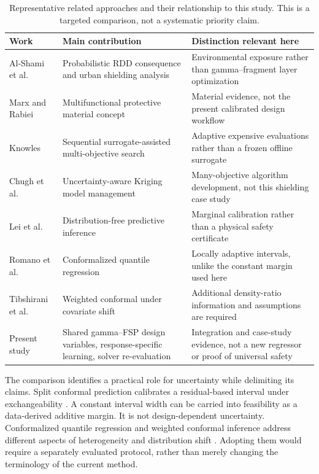 \begin{table}[htbp]
\centering\small
\caption{Representative related approaches and their relationship to this study. This is a targeted comparison, not a systematic priority claim.}\label{tab:related}
\begin{tabular}{@{}p{.25\linewidth}p{.32\linewidth}p{.35\linewidth}@{}}
\toprule Work & Main contribution & Distinction relevant here \\\midrule
Al-Shami et al. \cite{AlShami2026} & Probabilistic RDD consequence and urban shielding analysis & Environmental exposure rather than gamma--fragment layer optimization \\
Marx and Rabiei \cite{MarxRabiei2017CMF} & Multifunctional protective material concept & Material evidence, not the present calibrated design workflow \\
Knowles \cite{Knowles2006ParEGO} & Sequential surrogate-assisted multi-objective search & Adaptive expensive evaluations rather than a frozen offline surrogate \\
Chugh et al. \cite{Chugh2018KRVEA} & Uncertainty-aware Kriging model management & Many-objective algorithm development, not this shielding case study \\
Lei et al. \cite{Lei2018Conformal} & Distribution-free predictive inference & Marginal calibration rather than a physical safety certificate \\
Romano et al. \cite{Romano2019CQR} & Conformalized quantile regression & Locally adaptive intervals, unlike the constant margin used here \\
Tibshirani et al. \cite{Tibshirani2019Shift} & Weighted conformal under covariate shift & Additional density-ratio information and assumptions are required \\
Present study & Shared gamma--FSP design variables, response-specific learning, solver re-evaluation & Integration and case-study evidence, not a new regressor or proof of universal safety \\
\bottomrule
\end{tabular}
\end{table}

The comparison identifies a practical role for uncertainty while delimiting its claims. Split conformal prediction calibrates a residual-based interval under exchangeability \cite{Vovk2005Conformal,Lei2018Conformal}. A constant interval width can be carried into feasibility as a data-derived additive margin. It is not design-dependent uncertainty. Conformalized quantile regression and weighted conformal inference address different aspects of heterogeneity and distribution shift \cite{Romano2019CQR,Tibshirani2019Shift}. Adopting them would require a separately evaluated protocol, rather than merely changing the terminology of the current method.

